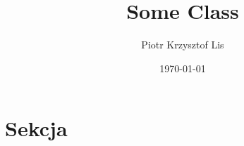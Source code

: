 \documentclass[12pt, chapterprefix=true]{report}
\title{\Huge{Some Class}}
\author{\huge{ Piotr Krzysztof Lis}}
\date{\today}
\begin{document}
\maketitle
\newpage
{}

\renewcommand*\contentsname{Spis treści}
\renewcommand{\figurename}{Ryc.}
\tableofcontents

\pagebreak
\chapter{Sekcja}
\end{document}
